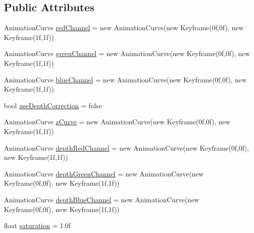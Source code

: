 \subsection*{Public Attributes}
\begin{DoxyCompactItemize}
\item 
Animation\+Curve \mbox{\hyperlink{class_unity_standard_assets_1_1_image_effects_1_1_color_correction_curves_a7903ae8291d5e32137882f9f5498ed56}{red\+Channel}} = new Animation\+Curve(new Keyframe(0f,0f), new Keyframe(1f,1f))
\item 
Animation\+Curve \mbox{\hyperlink{class_unity_standard_assets_1_1_image_effects_1_1_color_correction_curves_a75b334e1edb4970b58bf00c0434553df}{green\+Channel}} = new Animation\+Curve(new Keyframe(0f,0f), new Keyframe(1f,1f))
\item 
Animation\+Curve \mbox{\hyperlink{class_unity_standard_assets_1_1_image_effects_1_1_color_correction_curves_a56123d1dfdb362c4eda3db142db0e861}{blue\+Channel}} = new Animation\+Curve(new Keyframe(0f,0f), new Keyframe(1f,1f))
\item 
bool \mbox{\hyperlink{class_unity_standard_assets_1_1_image_effects_1_1_color_correction_curves_a9812451a2fd64a107315b47b11949065}{use\+Depth\+Correction}} = false
\item 
Animation\+Curve \mbox{\hyperlink{class_unity_standard_assets_1_1_image_effects_1_1_color_correction_curves_a6b9f921e5ae7d1dc4fd4c243d35d3cba}{z\+Curve}} = new Animation\+Curve(new Keyframe(0f,0f), new Keyframe(1f,1f))
\item 
Animation\+Curve \mbox{\hyperlink{class_unity_standard_assets_1_1_image_effects_1_1_color_correction_curves_a0651979e3b694bfe3f4a1d4f4ff1aa42}{depth\+Red\+Channel}} = new Animation\+Curve(new Keyframe(0f,0f), new Keyframe(1f,1f))
\item 
Animation\+Curve \mbox{\hyperlink{class_unity_standard_assets_1_1_image_effects_1_1_color_correction_curves_a970ebb883db7df47710dadc12763cb3e}{depth\+Green\+Channel}} = new Animation\+Curve(new Keyframe(0f,0f), new Keyframe(1f,1f))
\item 
Animation\+Curve \mbox{\hyperlink{class_unity_standard_assets_1_1_image_effects_1_1_color_correction_curves_a308d07f36a756f45afe4e308692a3d92}{depth\+Blue\+Channel}} = new Animation\+Curve(new Keyframe(0f,0f), new Keyframe(1f,1f))
\item 
float \mbox{\hyperlink{class_unity_standard_assets_1_1_image_effects_1_1_color_correction_curves_afdca84a10eb0cb06591f433006f90a63}{saturation}} = 1.\+0f
\item 

\end{DoxyCompactItemize}

